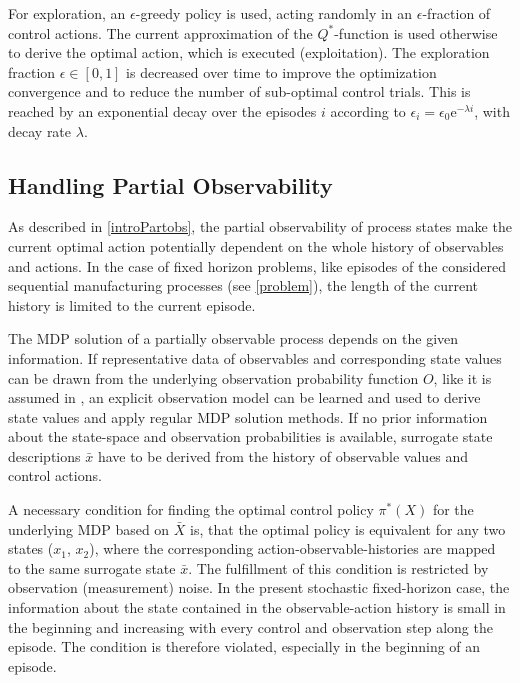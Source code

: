 For exploration, an $\epsilon$-greedy policy is used, acting randomly in an $\epsilon$-fraction of control actions. The current approximation of the $Q^*$-function is used otherwise to derive the optimal action, which is executed (exploitation). The exploration fraction $\epsilon \in [0,1]$ is decreased over time to improve the optimization convergence and to reduce the number of sub-optimal control trials. This is reached by an exponential decay over the episodes $i$ according to $\epsilon_i = \epsilon_0 \mathrm{e}^{-\lambda i}$, with decay rate $\lambda$. 
\subsection{Handling Partial Observability}
\label{partObs}
As described in \ref{introPartobs}, the partial observability of process states make the current optimal action potentially dependent on the whole history of observables and actions. In the case of fixed horizon problems, like episodes of the considered sequential manufacturing processes (see \ref{problem}), the length of the current history is limited to the current episode. 

The MDP solution of a partially observable process depends on the given information. If representative data of observables and corresponding state values can be drawn from the underlying observation probability function $O$, like it is assumed in \cite{Senn2014}, an explicit observation model can be learned and used to derive state values and apply regular MDP solution methods. If no prior information about the state-space and observation probabilities is available, surrogate state descriptions $\bar{x}$ have to be derived from the history of observable values and control actions.

A necessary condition for finding the optimal control policy $\pi^*(X)$ for the underlying MDP based on $\bar{X}$ is, that the optimal policy is equivalent for any two states ($x_1$, $x_2$), where the corresponding action-observable-histories are mapped to the same surrogate state $\bar{x}$. The fulfillment of this condition is restricted by observation (measurement) noise. In the present stochastic fixed-horizon case, the information about the state contained in the observable-action history is small in the beginning and increasing with every control and observation step along the episode. The condition is therefore violated, especially in the beginning of an episode.

